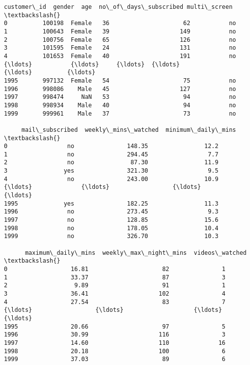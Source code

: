 \documentclass[11pt]{article}
\makeatletter
\newcommand{\boxspacing}{\kern\kvtcb@left@rule\kern\kvtcb@boxsep}
\newcommand{\prompt}[4]{
        {\ttfamily\llap{{\color{#2}[#3]:\hspace{3pt}#4}}\vspace{-\baselineskip}}
    }
\makeatother
\begin{document}
            \begin{tcolorbox}[breakable, size=fbox, boxrule=.5pt, pad at break*=1mm, opacityfill=0]
\prompt{Out}{outcolor}{28}{\boxspacing}
\begin{Verbatim}[commandchars=\\\{\}]
      customer\_id  gender  age  no\_of\_days\_subscribed multi\_screen  \textbackslash{}
0          100198  Female   36                     62           no
1          100643  Female   39                    149           no
2          100756  Female   65                    126           no
3          101595  Female   24                    131           no
4          101653  Female   40                    191           no
{\ldots}           {\ldots}     {\ldots}  {\ldots}                    {\ldots}          {\ldots}
1995       997132  Female   54                     75           no
1996       998086    Male   45                    127           no
1997       998474     NaN   53                     94           no
1998       998934    Male   40                     94           no
1999       999961    Male   37                     73           no

     mail\_subscribed  weekly\_mins\_watched  minimum\_daily\_mins  \textbackslash{}
0                 no               148.35                12.2
1                 no               294.45                 7.7
2                 no                87.30                11.9
3                yes               321.30                 9.5
4                 no               243.00                10.9
{\ldots}              {\ldots}                  {\ldots}                 {\ldots}
1995             yes               182.25                11.3
1996              no               273.45                 9.3
1997              no               128.85                15.6
1998              no               178.05                10.4
1999              no               326.70                10.3

      maximum\_daily\_mins  weekly\_max\_night\_mins  videos\_watched  \textbackslash{}
0                  16.81                     82               1
1                  33.37                     87               3
2                   9.89                     91               1
3                  36.41                    102               4
4                  27.54                     83               7
{\ldots}                  {\ldots}                    {\ldots}             {\ldots}
1995               20.66                     97               5
1996               30.99                    116               3
1997               14.60                    110              16
1998               20.18                    100               6
1999               37.03                     89               6


\end{Verbatim}
\end{tcolorbox}
\end{document}
